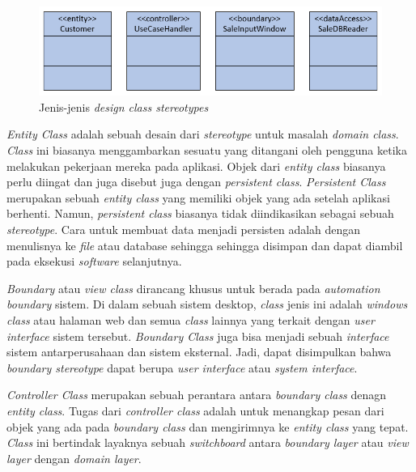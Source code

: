 \documentclass[a4paper]{article}
\begin{document}
\begin{enumerate}
\begin{enumerate}
\begin{itemize}
            \begin{figure}[h]
                \centering
                \includegraphics[scale=0.5]{images/uml satzinger/design class diagram/design class stereotypes.png}
                \caption{Jenis-jenis \textit{design class stereotypes}}
            \end{figure}

            \textit{Entity Class} adalah sebuah desain dari \textit{stereotype} untuk masalah \textit{domain class}. \textit{Class} ini biasanya menggambarkan sesuatu yang ditangani oleh pengguna ketika melakukan pekerjaan mereka pada aplikasi. Objek dari \textit{entity class} biasanya perlu diingat dan juga disebut juga dengan \textit{persistent class}. \textit{Persistent Class} merupakan sebuah \textit{entity class} yang memiliki objek yang ada setelah aplikasi berhenti. Namun, \textit{persistent class} biasanya tidak diindikasikan sebagai sebuah \textit{stereotype}. Cara untuk membuat data menjadi persisten adalah dengan menulisnya ke \textit{file} atau database sehingga sehingga disimpan dan dapat diambil pada eksekusi \textit{software} selanjutnya\autocite[376-382]{uml-satzinger}.
            
            \textit{Boundary} atau \textit{view class} dirancang khusus untuk berada pada \textit{automation boundary} sistem. Di dalam sebuah sistem desktop, \textit{class} jenis ini adalah \textit{windows class} atau halaman web dan semua \textit{class} lainnya yang terkait dengan \textit{user interface} sistem tersebut. \textit{Boundary Class} juga bisa menjadi sebuah \textit{interface} sistem antarperusahaan dan sistem eksternal. Jadi, dapat disimpulkan bahwa \textit{boundary stereotype} dapat berupa \textit{user interface} atau \textit{system interface}\autocite[376-382]{uml-satzinger}. 

            \textit{Controller Class} merupakan sebuah perantara antara \textit{boundary class} denagn \textit{entity class}. Tugas dari \textit{controller class} adalah untuk menangkap pesan dari objek yang ada pada \textit{boundary class} dan mengirimnya ke \textit{entity class} yang tepat. \textit{Class} ini bertindak layaknya sebuah \textit{switchboard} antara \textit{boundary layer} atau \textit{view layer} dengan \textit{domain layer}\autocite[376-382]{uml-satzinger}.


\end{itemize}
\end{enumerate}
\end{enumerate}
\end{document}
